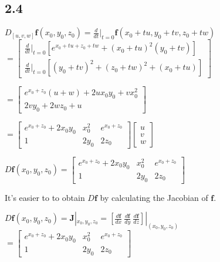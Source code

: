 \documentclass[12pt,a4paper,titlepage]{article}
\begin{document}
\subsection*{2.4}
\begin{flushleft}
$D_{[u,v,w]}\mathbf{f}(x_0,y_0,z_0)=\frac{d}{dt}|_{t=0}\mathbf{f}(x_0+tu,y_0+tv,z_0+tw)$\\
\vspace{1em}
$ =\left[ \begin{array}{ccc}
		 \frac{d}{dt}|_{t=0}[e^{x_0+tu+z_0+tw}+(x_0+tu)^2(y_0+tv)]\\
		 \frac{d}{dt}|_{t=0}[(y_0+tv)^2+(z_0+tw)^2+(x_0+tu)]
	    \end{array}
 \right]$

$ =\left[ \begin{array}{ccc}
		 e^{x_0+z_0}(u+w)+2ux_0 y_0+vx_0^2\\
		 2vy_0+2wz_0+u
		 \end{array}
 \right]$
 
$ =\left[ \begin{array}{ccc}
		 e^{x_0+z_0}+2x_0 y_0 & x_0^2 & e^{x_0+z_0}\\
		 1 & 2y_0 & 2z_0
		 \end{array}
 \right] \left[ \begin{array}{ccc}
				 u\\
				 v\\
				 w
	     \end{array}
		 \right]$
\end{flushleft}

\begin{flushleft}
$D\mathbf{f}(x_0,y_0,z_0)= \left[ 	\begin{array}{ccc}
							e^{x_0+z_0}+2x_0 y_0 & x_0^2 & e^{x_0+z_0}\\
							1 & 2y_0 & 2z_0
							\end{array}
					\right]$
\end{flushleft}

It's easier to to obtain $D\mathbf{f}$ by calculating the Jacobian of $\mathbf{f}$.\\
\begin{flushleft}
$D\mathbf{f}(x_0,y_0,z_0)= \mathbf{J}|_{x_0,y_0,z_0} 
=[\frac{d\mathbf{f}}{dx}\:\frac{d\mathbf{f}}{dy}\:\frac{d\mathbf{f}}{dz}]|_{(x_0,y_0,z_0)}$
$= \left[ 	\begin{array}{ccc}
			e^{x_0+z_0}+2x_0 y_0 & x_0^2 & e^{x_0+z_0}\\
			1 & 2y_0 & 2z_0
			\end{array}
  \right]$
\end{flushleft}
\end{document}
